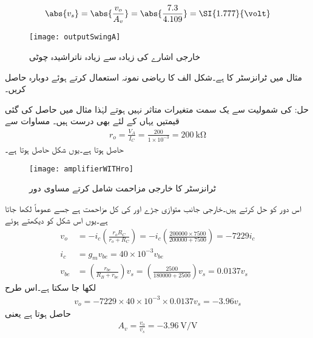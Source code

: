 \begin{align*}
\abs{v_s} = \abs{\frac{v_o}{A_v}}=\abs{\frac{7.3}{4.109}}=\SI{1.777}{\volt}
\end{align*}
%
\begin{figure}
\centering
\texttt{[image: outputSwingA]}
\caption{خارجی اشارے کی زیادہ سے زیادہ ناتراشیدہ چوٹی}
\label{شکل_خارجی_اشارے_کی_زیادہ_سے_زیادہ_ناتراشیدہ_چوٹی}
\end{figure}

مثال  میں ٹرانزسٹر کا   ہے۔شکل  الف کا ریاضی نمونہ  استعمال کرتے ہوئے  دوبارہ حاصل کریں۔

حل: کی شمولیت سے یک سمت متغیرات متاثر نہیں ہوتے لہٰذا مثال  میں حاصل کی گئی قیمتیں یہاں کے لئے بھی درست ہیں۔
مساوات  سے
\begin{align*}
r_o=\frac{V_A}{I_{C}}=\frac{200}{1 \times 10^{-3}}=\SI{200}{\kilo \ohm}
\end{align*}
حاصل ہوتا ہے۔یوں شکل  حاصل ہوتا ہے۔
\begin{figure}
\centering
\texttt{[image: amplifierWITHro]}
\caption{ٹرانزسٹر کا خارجی مزاحمت شامل کرتے مساوی دور}
\label{شکل_ایمپلیفائر_خارجی_مزاحمت_شامل}
\end{figure}
اس دور کو حل کرتے ہیں۔خارجی جانب متوازی جڑے  اور  کی کل مزاحمت  ہے جسے عموماً  لکھا جاتا ہے۔یوں اس شکل کو دیکھتے ہوئے
\begin{align*}
v_o&=-i_c \left(\frac{r_o R_C}{r_o+R_C} \right)=-i_c \left(\frac{200000 \times 7500}{200000+7500} \right)=-7229 i_c \\
i_c&=g_m v_{be}=40 \times 10^{-3} v_{be}\\
v_{be}&=\left(\frac{r_{be}}{R_B+r_{be}} \right) v_s=\left(\frac{2500}{180000+2500} \right) v_s=0.0137 v_s
\end{align*}
لکھا جا سکتا ہے۔اس طرح
\begin{align*}
v_o=-7229 \times 40 \times 10^{-3} \times 0.0137 v_s=-3.96 v_s
\end{align*}
حاصل ہوتا ہے  یعنی
\begin{align*}
A_v=\frac{v_o}{v_s}=\SI[per=frac,fraction=nice]{-3.96}{\volt \per \volt}
\end{align*}

